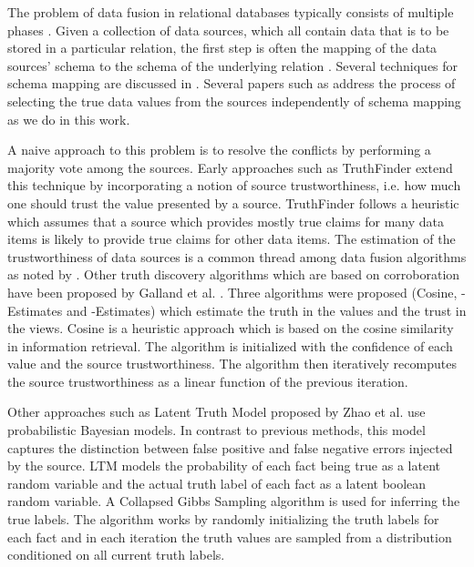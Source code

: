 \documentclass{acm_proc_article-sp}
\begin{document}
The problem of data fusion in relational databases typically consists of multiple phases \cite{bleiholder:data} \cite{li:truth}. Given a collection of data sources, which all contain data that is to be stored in a particular relation, the first step is often the mapping of the data sources' schema to the schema of the underlying relation \cite{bleiholder:data}. Several techniques for schema mapping are discussed in \cite{naumann:data}. Several papers such as \cite{li:truth} address the process of selecting the true data values from the sources independently of schema mapping as we do in this work.


A naive approach to this problem is to resolve the conflicts by performing a majority vote among the sources. Early approaches such as {\sc TruthFinder} \cite{yin:truth} extend this technique by incorporating a notion of source trustworthiness, i.e. how much one should trust the value presented by a source. {\sc TruthFinder} follows a heuristic which assumes that a source which provides mostly true claims for many data items is likely to provide true claims for other data items. The estimation of the trustworthiness of data sources   is a common thread among data fusion algorithms as noted by \cite{li:truth} \cite{waguih:truth}. Other truth discovery algorithms which are based on corroboration have been proposed by Galland et al. \cite{galland:corro}. Three algorithms were proposed ({\sc Cosine}, {-Estimates} and {-Estimates}) which estimate the truth in the values and the trust in the views. {\sc Cosine} is a heuristic approach which is based on the cosine similarity in information retrieval. The algorithm is initialized with the confidence of each value and the source trustworthiness. The algorithm then iteratively recomputes the source trustworthiness as a linear function of the previous iteration. 


Other approaches such as Latent Truth Model proposed by Zhao et al. \cite{zhao:bayesian} use probabilistic Bayesian models. In contrast to previous methods, this model captures the distinction between false positive and false negative errors injected by the source. LTM models the probability of each fact being true as a latent random variable and the actual truth label of each fact as a latent boolean random variable. A Collapsed Gibbs Sampling algorithm is used for inferring the true labels. The algorithm works by randomly initializing the truth labels for each fact and in each iteration the truth values are sampled from a distribution conditioned on all current truth labels. 
\end{document}

